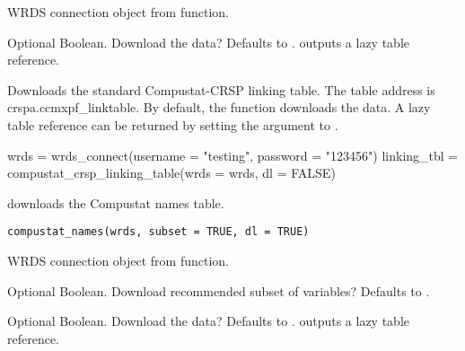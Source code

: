 \documentclass[a4paper]{book}
\begin{document}
%
\begin{Arguments}
\begin{ldescription}
\item[\code{wrds}] WRDS connection object from  function.

\item[\code{dl}] Optional Boolean. Download the data? Defaults to .  outputs a
lazy  table reference.
\end{ldescription}
\end{Arguments}
%
\begin{Details}\relax
Downloads the standard Compustat-CRSP linking table. The table address is crspa.ccmxpf\_linktable.
By default, the function downloads the data. A lazy  table reference can be returned
by setting the  argument to .
\end{Details}
%
\begin{Examples}
\begin{ExampleCode}
wrds = wrds_connect(username = "testing", password = "123456")
linking_tbl = compustat_crsp_linking_table(wrds = wrds, dl = FALSE)
\end{ExampleCode}
\end{Examples}
%
\begin{Description}\relax
{} downloads the Compustat names table.
\end{Description}
%
\begin{Usage}
\begin{verbatim}
compustat_names(wrds, subset = TRUE, dl = TRUE)
\end{verbatim}
\end{Usage}
%
\begin{Arguments}
\begin{ldescription}
\item[\code{wrds}] WRDS connection object from  function.

\item[\code{subset}] Optional Boolean. Download recommended subset of variables? Defaults to .

\item[\code{dl}] Optional Boolean. Download the data? Defaults to .  outputs a
lazy  table reference.
\end{ldescription}
\end{Arguments}
\end{document}
